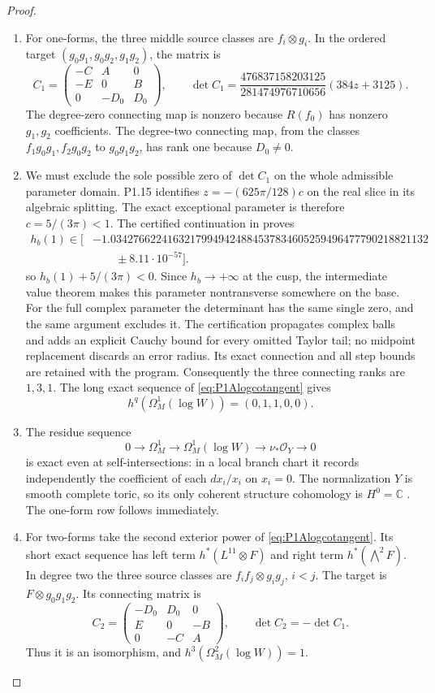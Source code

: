 \documentclass[11pt,a4paper]{article}
\theoremstyle{definition}
\begin{document}
\begin{proof}
\begin{enumerate}[label=\arabic*.]
\item For one-forms, the three middle source classes are $f_i\otimes g_i$.
In the ordered target $(g_0g_1,g_0g_2,g_1g_2)$, the matrix is
\[
C_1=\begin{pmatrix}-C&A&0\\-E&0&B\\0&-D_0&D_0\end{pmatrix},
\qquad
\det C_1=
\frac{476837158203125}{281474976710656}(384z+3125).
\]
The degree-zero connecting map is nonzero because $R(f_0)$
has nonzero $g_1,g_2$ coefficients. The degree-two connecting
map, from the classes $f_1g_0g_1,f_2g_0g_2$ to $g_0g_1g_2$,
has rank one because $D_0\ne0$.

\item We must exclude the sole possible zero of $\det C_1$ on the
whole admissible parameter domain. P1.15 identifies
$z=-(625\pi/128)c$ on the real slice in its algebraic splitting.
The exact exceptional parameter is therefore $c=5/(3\pi)<1$.
The certified continuation in
 proves
\[
\begin{aligned}
h_b(1)\in\bigl[&
-1.03427662241632179949424884537834605259496477790218821132\\
&\qquad\mathbin{\pm}8.11\cdot10^{-57}\bigr].
\end{aligned}
\]
so $h_b(1)+5/(3\pi)<0$. Since $h_b\to+\infty$ at the cusp,
the intermediate value theorem makes this parameter
nontransverse somewhere on the base. For the full complex
parameter the determinant has the same single zero, and the
same argument excludes it. The certification propagates complex
balls and adds an explicit Cauchy bound for every omitted
Taylor tail; no midpoint replacement discards an error radius.
Its exact connection and all step bounds are retained with the
program. Consequently the three connecting ranks are $1,3,1$.
The long exact sequence of \eqref{eq:P1Alogcotangent} gives
\[
h^q(\Omega_M^1(\log W))=(0,1,1,0,0).
\]

\item The residue sequence
\[
0\to\Omega_M^1\to\Omega_M^1(\log W)\to\nu_*\mathcal O_Y\to0
\]
is exact even at self-intersections: in a local branch chart it
records independently the coefficient of each $dx_i/x_i$ on
$x_i=0$. The normalization $Y$ is smooth complete toric, so its
only coherent structure cohomology is $H^0=\mathbb C$ \cite[Theorem 9.2.3, p.~410]{CoxLittleSchenck2011}.
The one-form row follows immediately.

\item For two-forms take the second exterior power of
\eqref{eq:P1Alogcotangent}. Its short exact sequence has left
term $h^*(L^{11}\otimes F)$ and right term
$h^*(\bigwedge^2F)$. In degree two the three source classes
are $f_if_j\otimes g_ig_j$, $i<j$. The target is
$F\otimes g_0g_1g_2$. Its connecting matrix is
\[
C_2=\begin{pmatrix}-D_0&D_0&0\\E&0&-B\\0&-C&A\end{pmatrix},
\qquad \det C_2=-\det C_1.
\]
Thus it is an isomorphism, and
$h^3(\Omega_M^2(\log W))=1$.


\end{enumerate}
\end{proof}
\end{document}

